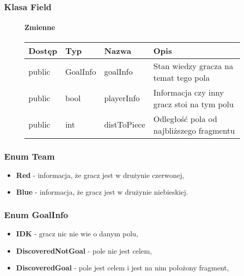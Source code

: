 \documentclass[../Dokumentacja.tex]{subfiles}
\begin{document}
\subsubsection{Klasa Field}
\begin{figure}[H]
    \paragraph{Zmienne}
    \begin{center}
        \begin{tabular}{ | l | l | l | p{5cm} |}
            \hline
            Dostęp & Typ & Nazwa & Opis \\ \hline
            public & GoalInfo & goalInfo & Stan wiedzy gracza na temat tego pola \\ \hline
            public & bool & playerInfo & Informacja czy inny gracz stoi na tym polu \\ \hline
            public & int & distToPiece & Odległość pola od najbliższego fragmentu \\ \hline
        \end{tabular}
    \end{center}
\end{figure}
\subsubsection{Enum Team}
\begin{itemize}
    \item \textbf{Red} - informacja, że gracz jest w drużynie czerwonej,
    \item \textbf{Blue} - informacja, że gracz jest w drużynie niebieskiej.
\end{itemize}
\subsubsection{Enum GoalInfo}
\begin{itemize}
    \item \textbf{IDK} - gracz nic nie wie o danym polu,
    \item \textbf{DiscoveredNotGoal} - pole nie jest celem,
    \item \textbf{DiscoveredGoal} - pole jest celem i jest na nim położony fragment,
\end{itemize}
\end{document}
